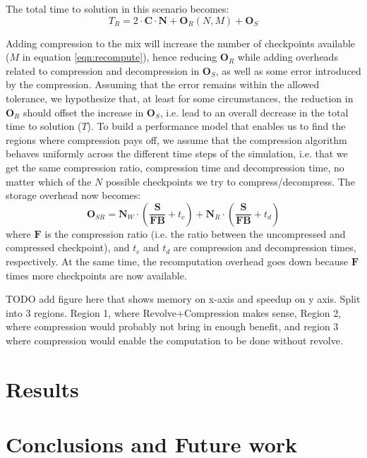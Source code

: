 \documentclass[conference]{IEEEtran}
\begin{document}
The total time to solution in this scenario becomes:
\begin{equation}
T_R = 2 \cdot \mathbf{C} \cdot \mathbf{N} + \mathbf{O}_R(N, M) + \mathbf{O}_S
\end{equation}

Adding compression to the mix will increase the number of checkpoints available ($M$ in equation \ref{eqn:recompute}),
hence reducing $\mathbf{O}_R$ while adding overheads related to compression and decompression in $\mathbf{O}_S$,
as well as some error introduced by the compression. Assuming that the error remains within the allowed tolerance,
we hypothesize that, at least for some circumstances, the reduction in $\mathbf{O}_R$ should offset the increase in 
$\mathbf{O}_S$, i.e. lead to an overall decrease in the total time to solution ($T$). To build a performance model that
enables us to find the regions where compression pays off, we assume that the compression algorithm behaves uniformly
across the different time steps of the simulation, i.e. that we get the same compression ratio, compression time and 
decompression time, no matter which of the $N$ possible checkpoints we try to compress/decompress. The storage overhead
now becomes:
\begin{equation}
\mathbf{O}_{SR} = \mathbf{N}_W \cdot (\frac{\mathbf{S}}{\mathbf{F}\mathbf{B}} + t_c) + \mathbf{N}_R \cdot (\frac{\mathbf{S}}{\mathbf{F}\mathbf{B}} + t_d)
\end{equation}
where $\mathbf{F}$ is the compression ratio (i.e. the ratio between the uncompressed and compressed checkpoint), and $t_c$
and $t_d$ are compression and decompression times, respectively. At the same time, the recomputation overhead goes down
because $\mathbf{F}$ times more checkpoints are now available.


TODO add figure here that shows memory on x-axis and speedup on y axis. Split into 3 regions. Region 1, 
where Revolve+Compression makes sense, Region 2, where compression would probably not bring in enough benefit, 
and region 3 where compression would enable the computation to be done without revolve. 
\section{Results}


\section{Conclusions and Future work}
\end{document}
